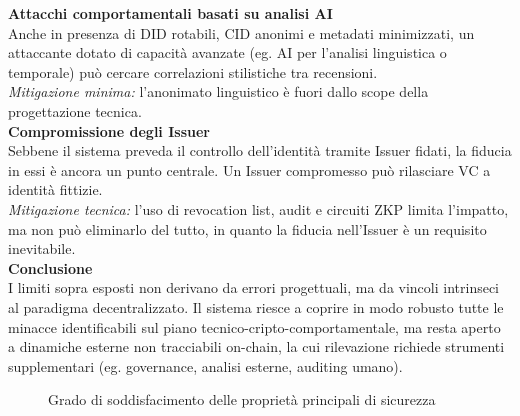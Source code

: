         \noindent \textbf{Attacchi comportamentali basati su analisi AI} \\
            Anche in presenza di DID rotabili, CID anonimi e metadati minimizzati, un attaccante dotato di capacità avanzate (eg. AI per l'analisi linguistica o temporale) può cercare correlazioni stilistiche tra recensioni. \\
            \textit{Mitigazione minima:} l'anonimato linguistico è fuori dallo scope della progettazione tecnica. \\

        \noindent \textbf{Compromissione degli Issuer} \\
            Sebbene il sistema preveda il controllo dell'identità tramite Issuer fidati, la fiducia in essi è ancora un punto centrale. Un Issuer compromesso può rilasciare VC a identità fittizie. \\
            \textit{Mitigazione tecnica:} l'uso di revocation list, audit e circuiti ZKP limita l'impatto, ma non può eliminarlo del tutto, in quanto la fiducia nell’Issuer è un requisito inevitabile. \\

        \noindent \textbf{Conclusione} \\
            I limiti sopra esposti non derivano da errori progettuali, ma da vincoli intrinseci al paradigma decentralizzato. Il sistema riesce a coprire in modo robusto tutte le minacce identificabili sul piano tecnico-cripto-comportamentale, ma resta aperto a dinamiche esterne non tracciabili on-chain, la cui rilevazione richiede strumenti supplementari (eg. governance, analisi esterne, auditing umano).

    \newpage

    \begin{figure}[H]
        
        \caption{Grado di soddisfacimento delle proprietà principali di sicurezza}
        \label{fig:radar-wp3}
    \end{figure}